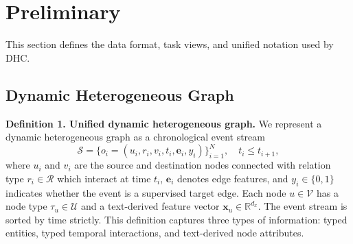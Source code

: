 
\section{Preliminary}

This section defines the data format, task views, and unified notation used by DHC. 
\subsection{Dynamic Heterogeneous Graph}

\textbf{Definition 1. Unified dynamic heterogeneous graph.}
We represent a dynamic heterogeneous graph as a chronological event stream
\begin{equation}
\mathcal{S}=\{o_i=(u_i,r_i,v_i,t_i,\mathbf{e}_i,y_i)\}_{i=1}^{N}, \quad t_i \leq t_{i+1},
\label{eq:event_stream}
\end{equation}
where $u_i$ and $v_i$ are the source and destination nodes connected with relation type $r_i\in\mathcal{R}$ which interact at time $t_i$, 
$\mathbf{e}_i$ denotes edge features, and $y_i\in\{0,1\}$ indicates whether the event is a supervised target edge. 
Each node $u\in\mathcal{V}$ has a node type $\tau_u\in\mathcal{U}$ and a text-derived feature vector $\mathbf{x}_u\in\mathbb{R}^{d_x}$. 
The event stream is sorted by time strictly. This definition captures three types of information: typed entities, typed temporal interactions, and text-derived node attributes.

